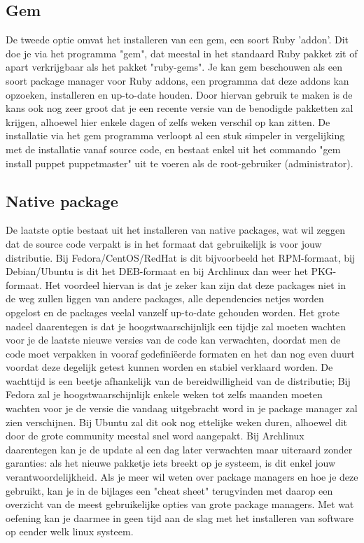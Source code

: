 \subsection{Gem}
De tweede optie omvat het installeren van een gem, een soort Ruby 'addon'. Dit doe je via het programma "gem", dat meestal in het standaard Ruby pakket zit of apart verkrijgbaar als het pakket "ruby-gems". Je kan gem beschouwen als een soort package manager voor Ruby addons, een programma dat deze addons kan opzoeken, installeren en up-to-date houden. Door hiervan gebruik te maken is de kans ook nog zeer groot dat je een recente versie van de benodigde pakketten zal krijgen, alhoewel hier enkele dagen of zelfs weken verschil op kan zitten. De installatie via het gem programma verloopt al een stuk simpeler in vergelijking met de installatie vanaf source code, en bestaat enkel uit het commando "gem install puppet puppetmaster" uit te voeren als de root-gebruiker (administrator).
\subsection{Native package}
De laatste optie bestaat uit het installeren van native packages, wat wil zeggen dat de source code verpakt is in het formaat dat gebruikelijk is voor jouw distributie. Bij Fedora/CentOS/RedHat is dit bijvoorbeeld het RPM-formaat, bij Debian/Ubuntu is dit het DEB-formaat en bij Archlinux dan weer het PKG-formaat. Het voordeel hiervan is dat je zeker kan zijn dat deze packages niet in de weg zullen liggen van andere packages, alle dependencies netjes worden opgelost en de packages veelal vanzelf up-to-date gehouden worden. Het grote nadeel daarentegen is dat je hoogstwaarschijnlijk een tijdje zal moeten wachten voor je de laatste nieuwe versies van de code kan verwachten, doordat men de code moet verpakken in vooraf gedefini\"{e}erde formaten en het dan nog even duurt voordat deze degelijk getest kunnen worden en stabiel verklaard worden. De wachttijd is een beetje afhankelijk van de bereidwilligheid van de distributie; Bij Fedora zal je hoogstwaarschijnlijk enkele weken tot zelfs maanden moeten wachten voor je de versie die vandaag uitgebracht word in je package manager zal zien verschijnen. Bij Ubuntu zal dit ook nog ettelijke weken duren, alhoewel dit door de grote community meestal snel word aangepakt. Bij Archlinux daarentegen kan je de update al een dag later verwachten maar uiteraard zonder garanties: als het nieuwe pakketje iets breekt op je systeem, is dit enkel jouw verantwoordelijkheid. Als je meer wil weten over package managers en hoe je deze gebruikt, kan je in de bijlages een "cheat sheet" terugvinden met daarop een overzicht van de meest gebruikelijke opties van grote package managers. Met wat oefening kan je daarmee in geen tijd aan de slag met het installeren van software op eender welk linux systeem.

